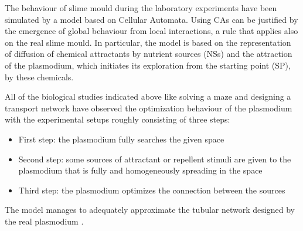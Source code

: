 The behaviour of slime mould during the laboratory experiments have been simulated by a model based on Cellular Automata. Using CAs can be justified by the emergence of global behaviour from local interactions, a rule that applies also on the real slime mould.
In particular, the model is based on the representation of diffusion of chemical attractants by nutrient sources (NSs) and the attraction of the plasmodium, which initiates its exploration from the starting point (SP), by these chemicals. 
\par
All of the biological studies indicated above like solving a maze and designing a transport network have observed the optimization behaviour of the plasmodium with the experimental setups roughly consisting of three steps:
\begin{itemize}
\item First step: the plasmodium fully searches the given space
\item Second step: some sources of attractant or repellent stimuli are given to the plasmodium that is fully and homogeneously spreading in the space
\item Third step: the plasmodium optimizes the connection between the sources
\end{itemize}

The model manages to adequately approximate the tubular network designed by the real plasmodium \cite{shirakawa2015construction}.

